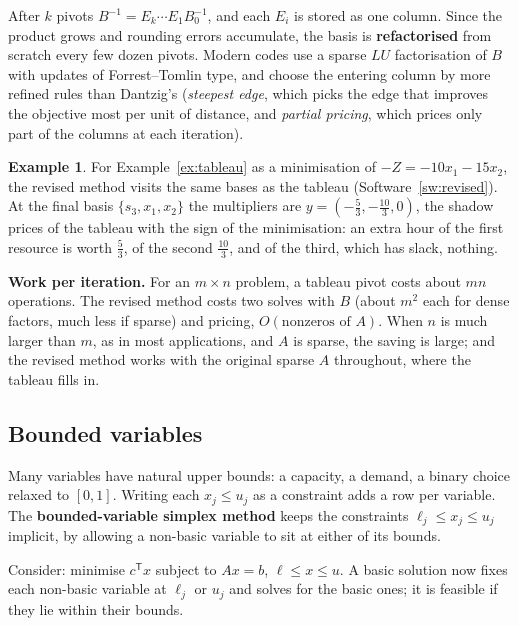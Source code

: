 \documentclass[11pt,a4paper]{article}
\numberwithin{equation}{section}
\theoremstyle{definition}
\newtheorem{exa}[thm]{Example}
\begin{document}
After $k$ pivots $B^{-1} = E_k\cdots E_1B_0^{-1}$, and each $E_i$ is stored as one column. Since the product grows and rounding errors accumulate, the basis is \textbf{refactorised} from scratch every few dozen pivots. Modern codes use a sparse $LU$ factorisation of $B$ with updates of Forrest--Tomlin type, and
choose the entering column by more refined rules than Dantzig's (\emph{steepest edge}, which picks the edge that improves the objective most per unit of distance, and \emph{partial pricing}, which prices only part of the columns at each iteration).

\begin{exa}
\label{ex:revised}
For Example~\ref{ex:tableau} as a minimisation of $-Z = -10x_1 - 15x_2$, the revised method visits the same bases as the tableau (Software~\ref{sw:revised}). At the final basis $\{s_3, x_1, x_2\}$ the multipliers are $y = (-\frac53, -\frac{10}3, 0)$, the shadow prices of the tableau with the sign of the
minimisation: an extra hour of the first resource is worth $\frac53$, of the second $\frac{10}3$, and of the third, which has slack, nothing.
\end{exa}

\textbf{Work per iteration.} For an $m \times n$ problem, a tableau pivot costs about $mn$ operations. The revised method costs two solves with $B$ (about $m^2$ each for dense factors, much less if sparse) and pricing, $O(\text{nonzeros of } A)$. When $n$ is much larger than $m$, as in most applications, and $A$ is
sparse, the saving is large; and the revised method works with the original sparse $A$ throughout, where the tableau fills in.

\subsection{Bounded variables}
\label{ssec:bounded}

Many variables have natural upper bounds: a capacity, a demand, a binary choice relaxed to $[0, 1]$. Writing each $x_j \leq u_j$ as a constraint adds a row per variable. The \textbf{bounded-variable simplex method} keeps the constraints $\ell_j \leq x_j \leq u_j$ implicit, by allowing a non-basic variable to sit at
either of its bounds.

Consider: minimise $c^{\mathsf T}x$ subject to $Ax = b$, $\ell \leq x \leq u$. A basic solution now fixes each non-basic variable at $\ell_j$ or $u_j$ and solves for the basic ones; it is feasible if they lie within their bounds.
\end{document}
